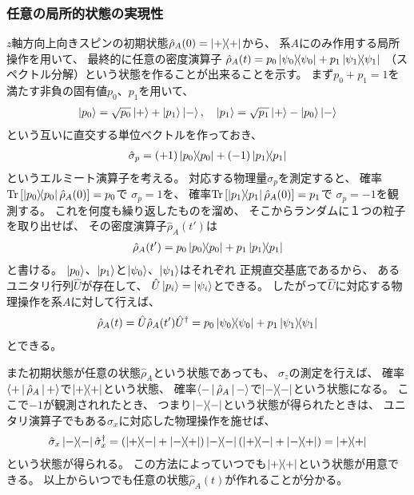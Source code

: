 \documentclass[a4paper, 10pt]{jsarticle}
\begin{document}
\subsubsection{任意の局所的状態の実現性}
$z$軸方向上向きスピンの初期状態$\hat{\rho}_A (0) = \Ket{+} \! \! \Bra{+}$から、
系$A$にのみ作用する局所操作を用いて、
最終的に任意の密度演算子
$\hat{\rho}_A (t)
= p_0 \Ket{\psi_0} \! \! \Bra{\psi_0} + p_1 \Ket{\psi_1} \! \! \Bra{\psi_1}$
（スペクトル分解）という状態を作ることが出来ることを示す。
まず$p_0 + p_1 = 1$を満たす非負の固有値$p_0$、$p_1$を用いて、
\begin{align}
	\Ket{p_0} = \sqrt{p_0} \Ket{+} + \Ket{p_1} \Ket{-}, \quad
	\Ket{p_1} = \sqrt{p_1} \Ket{+} - \Ket{p_0} \Ket{-}
\end{align}
という互いに直交する単位ベクトルを作っておき、
\begin{align}
	\hat{\sigma}_p = (+1) \Ket{p_0} \! \! \Bra{p_0} + (-1) \Ket{p_1} \! \! \Bra{p_1}
\end{align}
というエルミート演算子を考える。
対応する物理量$\sigma_p$を測定すると、
確率$\operatorname*{Tr} \left[ \Ket{p_0} \! \! \Bra{p_0} \hat{\rho}_A (0) \right] = p_0$で
$\sigma_p = 1$を、
確率$\operatorname*{Tr} \left[ \Ket{p_1} \! \! \Bra{p_1} \hat{\rho}_A (0) \right] = p_1$で
$\sigma_p = -1$を観測する。
これを何度も繰り返したものを溜め、
そこからランダムに１つの粒子を取り出せば、
その密度演算子$\hat{\rho}_A (t')$は
\begin{align}
	\hat{\rho}_A (t') = p_0 \Ket{p_0} \! \! \Bra{p_0} + p_1 \Ket{p_1} \! \! \Bra{p_1}
\end{align}
と書ける。
$\Ket{p_0}$、$\Ket{p_1}$と$\Ket{\psi_0}$、$\Ket{\psi_1}$はそれぞれ
正規直交基底であるから、
あるユニタリ行列$\hat{U}$が存在して、
$\hat{U} \Ket{p_i} = \Ket{\psi_i}$とできる。
したがって$\hat{U}$に対応する物理操作を系$A$に対して行えば、
\begin{align}
	\hat{\rho}_A (t) = \hat{U} \hat{\rho}_A (t') \hat{U}^\dagger
	= p_0 \Ket{\psi_0} \! \! \Bra{\psi_0} + p_1 \Ket{\psi_1} \! \! \Bra{\psi_1}
\end{align}
とできる。

また初期状態が任意の状態$\hat{\rho}_A$という状態であっても、
$\sigma_z$の測定を行えば、
確率$\Braket{+ | \hat{\rho}_A | +}$で$\Ket{+} \! \! \Bra{+}$という状態、
確率$\Braket{- | \hat{\rho}_A | -}$で$\Ket{-} \! \! \Bra{-}$という状態になる。
ここで$-1$が観測されれたとき、
つまり$\Ket{-} \! \! \Bra{-}$という状態が得られたときは、
ユニタリ演算子でもある$\hat{\sigma}_x$に対応した物理操作を施せば、
\begin{align}
	\hat{\sigma}_x \Ketbra{-}{-} \hat{\sigma}_x^\dagger
	= \left( \Ketbra{+}{-} + \Ketbra{-}{+} \right) \Ketbra{-}{-}
	\left( \Ketbra{+}{-} + \Ketbra{-}{+} \right)
	= \Ketbra{+}{+}
\end{align}
という状態が得られる。
この方法によっていつでも$\Ket{+} \! \! \Bra{+}$という状態が用意できる。
以上からいつでも任意の状態$\hat{\rho}_A (t)$が作れることが分かる。
\end{document}
